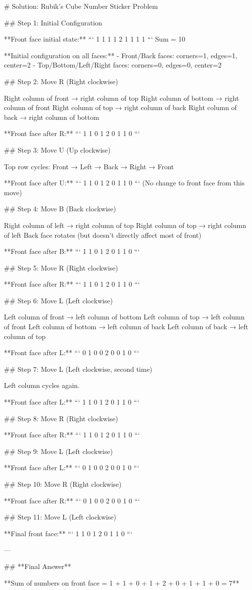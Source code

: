 # Solution: Rubik's Cube Number Sticker Problem

## Step 1: Initial Configuration

**Front face initial state:**
```
1 1 1
1 2 1
1 1 1
```
Sum = 10

**Initial configuration on all faces:**
- Front/Back faces: corners=1, edges=1, center=2
- Top/Bottom/Left/Right faces: corners=0, edges=0, center=2

## Step 2: Move R (Right clockwise)

Right column of front → right column of top
Right column of bottom → right column of front
Right column of top → right column of back
Right column of back → right column of bottom

**Front face after R:**
```
1 1 0
1 2 0
1 1 0
```

## Step 3: Move U (Up clockwise)

Top row cycles: Front → Left → Back → Right → Front

**Front face after U:**
```
1 1 0
1 2 0
1 1 0
```
(No change to front face from this move)

## Step 4: Move B (Back clockwise)

Right column of left → right column of top
Right column of top → right column of left  
Back face rotates (but doesn't directly affect most of front)

**Front face after B:**
```
1 1 0
1 2 0
1 1 0
```

## Step 5: Move R (Right clockwise)

**Front face after R:**
```
1 1 0
1 2 0
1 1 0
```

## Step 6: Move L (Left clockwise)

Left column of front → left column of bottom
Left column of top → left column of front
Left column of bottom → left column of back
Left column of back → left column of top

**Front face after L:**
```
0 1 0
0 2 0
0 1 0
```

## Step 7: Move L (Left clockwise, second time)

Left column cycles again.

**Front face after L:**
```
1 1 0
1 2 0
1 1 0
```

## Step 8: Move R (Right clockwise)

**Front face after R:**
```
1 1 0
1 2 0
1 1 0
```

## Step 9: Move L (Left clockwise)

**Front face after L:**
```
0 1 0
0 2 0
0 1 0
```

## Step 10: Move R (Right clockwise)

**Front face after R:**
```
0 1 0
0 2 0
0 1 0
```

## Step 11: Move L (Left clockwise)

**Final front face:**
```
1 1 0
1 2 0
1 1 0
```

---

## **Final Answer**

**Sum of numbers on front face = 1 + 1 + 0 + 1 + 2 + 0 + 1 + 1 + 0 = 7**
